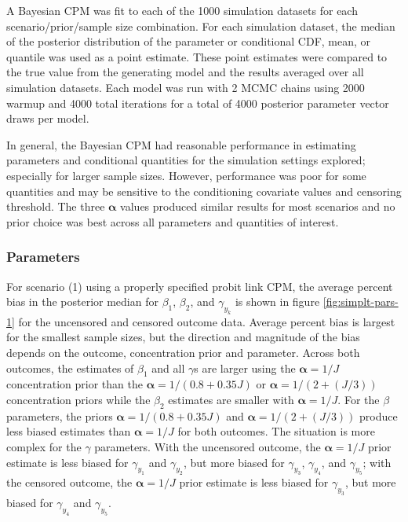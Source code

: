\documentclass[
]{article}
\begin{document}
A Bayesian CPM was fit to each of the 1000 simulation datasets for each scenario/prior/sample size combination. For each simulation dataset, the median of the posterior distribution of the parameter or conditional CDF, mean, or quantile was used as a point estimate. These point estimates were compared to the true value from the generating model and the results averaged over all simulation datasets. Each model was run with 2 MCMC chains using 2000 warmup and 4000 total iterations for a total of 4000 posterior parameter vector draws per model.

In general, the Bayesian CPM had reasonable performance in estimating parameters and conditional quantities for the simulation settings explored; especially for larger sample sizes. However, performance was poor for some quantities and may be sensitive to the conditioning covariate values and censoring threshold. The three \(\boldsymbol{\alpha}\) values produced similar results for most scenarios and no prior choice was best across all parameters and quantities of interest.

\hypertarget{parameters}{%
\subsubsection{Parameters}\label{parameters}}

For scenario (1) using a properly specified probit link CPM, the average percent bias in the posterior median for \(\beta_1\), \(\beta_2\), and \(\gamma_{y_k}\) is shown in figure \ref{fig:simplt-pars-1} for the uncensored and censored outcome data. Average percent bias is largest for the smallest sample sizes, but the direction and magnitude of the bias depends on the outcome, concentration prior and parameter. Across both outcomes, the estimates of \(\beta_1\) and all \(\gamma\)s are larger using the \(\boldsymbol{\alpha}=1/J\) concentration prior than the \(\boldsymbol{\alpha}=1/(0.8+0.35J)\) or \(\boldsymbol{\alpha}=1/(2+(J/3))\) concentration priors while the \(\beta_2\) estimates are smaller with \(\boldsymbol{\alpha}=1/J\). For the \(\beta\) parameters, the priors \(\boldsymbol{\alpha}=1/(0.8+0.35J)\) and \(\boldsymbol{\alpha}=1/(2+(J/3))\) produce less biased estimates than \(\boldsymbol{\alpha}=1/J\) for both outcomes. The situation is more complex for the \(\gamma\) parameters. With the uncensored outcome, the \(\boldsymbol{\alpha}=1/J\) prior estimate is less biased for \(\gamma_{y_1}\) and \(\gamma_{y_2}\), but more biased for \(\gamma_{y_3}\), \(\gamma_{y_4}\), and \(\gamma_{y_5}\); with the censored outcome, the \(\boldsymbol{\alpha}=1/J\) prior estimate is less biased for \(\gamma_{y_3}\), but more biased for \(\gamma_{y_4}\) and \(\gamma_{y_5}\).
\end{document}
